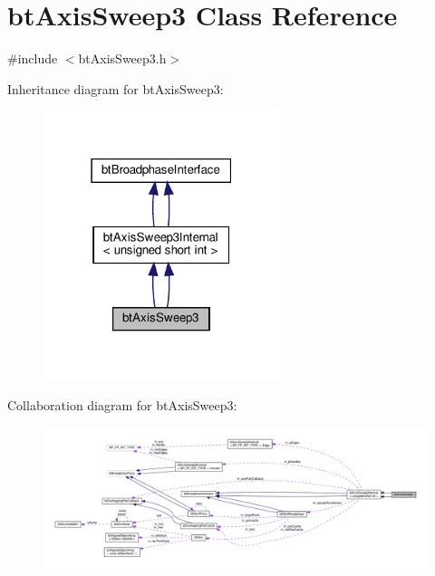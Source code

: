 \hypertarget{classbtAxisSweep3}{}\section{bt\+Axis\+Sweep3 Class Reference}
\label{classbtAxisSweep3}


{\ttfamily \#include $<$bt\+Axis\+Sweep3.\+h$>$}



Inheritance diagram for bt\+Axis\+Sweep3\+:
\nopagebreak
\begin{figure}[H]
\begin{center}
\leavevmode
\includegraphics[width=195pt]{classbtAxisSweep3__inherit__graph}
\end{center}
\end{figure}


Collaboration diagram for bt\+Axis\+Sweep3\+:
\nopagebreak
\begin{figure}[H]
\begin{center}
\leavevmode
\includegraphics[width=350pt]{classbtAxisSweep3__coll__graph}
\end{center}
\end{figure}
